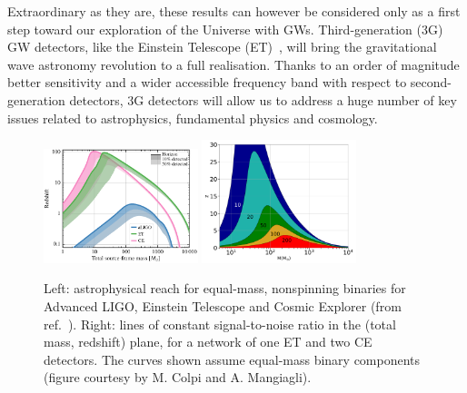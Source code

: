 Extraordinary as they are, these results can however be considered only as a first step toward our exploration of the Universe with GWs.
Third-generation (3G) GW detectors, like the Einstein Telescope (ET)~\cite{Punturo:2010zz}, will bring the  gravitational wave astronomy revolution to a full realisation. Thanks to an order of magnitude better sensitivity and a wider accessible frequency band with respect to second-generation detectors, 3G detectors will allow us to address a huge number of key issues related to  astrophysics, fundamental physics  and cosmology. 


\begin{figure}[t]
 \centering
 \includegraphics[width=0.4\textwidth]{Figures/gw_horizons.pdf}\qquad\qquad
 \hspace{-0.09\textwidth}
  \includegraphics[width=0.4\textwidth]{Figures/waterfall_ET+2CE_maxspin0_q1.pdf}
 \caption{Left: astrophysical reach  for equal-mass, nonspinning binaries  for Advanced LIGO, Einstein Telescope and Cosmic Explorer (from ref.~\cite{Sathyaprakash:2019nnu,3GScienceBook}). Right:
lines of constant signal-to-noise ratio in the  (total mass, redshift)  plane, for a network of one ET and two CE detectors. The curves shown assume equal-mass binary components (figure courtesy by M. Colpi and A. Mangiagli).}
\label{fig:gw_horizons}
\end{figure}


